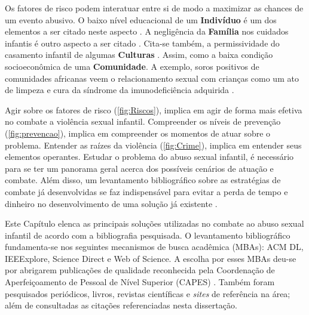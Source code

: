 Os fatores de risco podem interatuar entre si de modo a maximizar as chances de um evento abusivo. O baixo nível educacional de um \textbf{Indivíduo} é um dos elementos a ser citado neste aspecto \cite{dahlberg2006violencia}. A negligência da \textbf{Família} nos cuidados infantis é outro aspecto a ser citado \cite{blasco2018abuso}. Cita-se também, a permissividade do casamento infantil de algumas \textbf{Culturas} \cite{bandiera2017women}. Assim, como a baixa condição socioeconômica de uma \textbf{Comunidade}. A exemplo, soros positivos de comunidades africanas veem o relacionamento sexual com crianças como um ato de limpeza e cura da síndrome da imunodeficiência adquirida \cite{aded2006abuso}.



Agir sobre os fatores de risco (\autoref{fig:Riscos}), implica em agir de forma mais efetiva no combate a violência sexual infantil. Compreender os níveis de prevenção (\autoref{fig:prevencao}), implica em compreender os momentos de atuar sobre o problema. Entender as raízes da violência (\autoref{fig:Crime}), implica em entender seus elementos operantes. Estudar o problema do abuso sexual infantil, é necessário para se ter um panorama geral acerca dos possíveis cenários de atuação e combate. Além disso, um levantamento bibliográfico sobre as estratégias de combate já desenvolvidas se faz indispensável para evitar a perda de tempo e dinheiro no desenvolvimento de uma solução já existente \cite{wazlawick2014metodologia}. 

Este Capítulo elenca as principais soluções utilizadas no combate ao abuso sexual infantil de acordo com a bibliografia pesquisada. O levantamento bibliográfico fundamenta-se nos seguintes mecanismos de busca acadêmica (MBAs): ACM DL, IEEExplore, Science Direct e Web of Science. A escolha por esses MBAs deu-se por abrigarem publicações de qualidade reconhecida pela Coordenação de Aperfeiçoamento de Pessoal de Nível Superior (CAPES) \cite{capes2016}%
. Também foram pesquisados periódicos, livros, revistas científicas e \textit{sites} de referência na área; além de consultadas as citações referenciadas nesta dissertação. 


